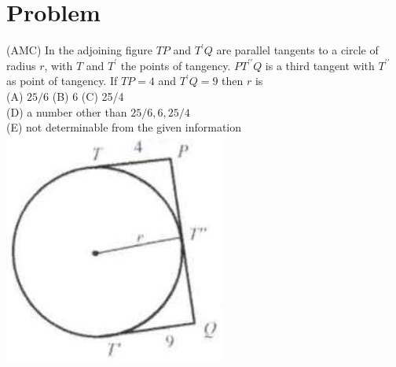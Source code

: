\documentclass{article}
\begin{document}
\section*{Problem}
(AMC) In the adjoining figure \(T P\) and \(T^{\prime} Q\) are parallel tangents to a circle of radius \(r\), with \(T\) and \(T^{\prime}\) the points of tangency. \(P T^{\prime \prime} Q\) is a third tangent with \(T^{\prime \prime}\) as point of tangency. If \(T P=4\) and \(T^{\prime} Q=9\) then \(r\) is\\
(A) \(25 / 6\) (B) 6 (C) 25/4\\
(D) a number other than \(25 / 6,6,25 / 4\)\\
(E) not determinable from the given information\\
\centering
\includegraphics[width=\textwidth]{images/156(2).jpg}
\end{document}
